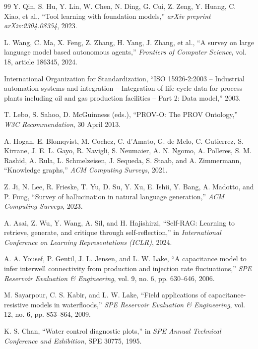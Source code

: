 \documentclass{article}
\begin{document}
\begin{thebibliography}{99}
 Y. Qin, S. Hu, Y. Lin, W. Chen, N. Ding, G. Cui, Z. Zeng, Y. Huang, C. Xiao, et al., ``Tool learning with foundation models,'' \emph{arXiv preprint arXiv:2304.08354}, 2023.

 L. Wang, C. Ma, X. Feng, Z. Zhang, H. Yang, J. Zhang, et al., ``A survey on large language model based autonomous agents,'' \emph{Frontiers of Computer Science}, vol. 18, article 186345, 2024.

 International Organization for Standardization, ``ISO 15926-2:2003 -- Industrial automation systems and integration -- Integration of life-cycle data for process plants including oil and gas production facilities -- Part 2: Data model,'' 2003.

 T. Lebo, S. Sahoo, D. McGuinness (eds.), ``PROV-O: The PROV Ontology,'' \emph{W3C Recommendation}, 30 April 2013.

 A. Hogan, E. Blomqvist, M. Cochez, C. d'Amato, G. de Melo, C. Gutierrez, S. Kirrane, J. E. L. Gayo, R. Navigli, S. Neumaier, A. N. Ngomo, A. Polleres, S. M. Rashid, A. Rula, L. Schmelzeisen, J. Sequeda, S. Staab, and A. Zimmermann, ``Knowledge graphs,'' \emph{ACM Computing Surveys}, 2021.

 Z. Ji, N. Lee, R. Frieske, T. Yu, D. Su, Y. Xu, E. Ishii, Y. Bang, A. Madotto, and P. Fung, ``Survey of hallucination in natural language generation,'' \emph{ACM Computing Surveys}, 2023.

 A. Asai, Z. Wu, Y. Wang, A. Sil, and H. Hajishirzi, ``Self-RAG: Learning to retrieve, generate, and critique through self-reflection,'' in \emph{International Conference on Learning Representations (ICLR)}, 2024.

 A. A. Yousef, P. Gentil, J. L. Jensen, and L. W. Lake, ``A capacitance model to infer interwell connectivity from production and injection rate fluctuations,'' \emph{SPE Reservoir Evaluation \& Engineering}, vol. 9, no. 6, pp. 630--646, 2006.

 M. Sayarpour, C. S. Kabir, and L. W. Lake, ``Field applications of capacitance-resistive models in waterfloods,'' \emph{SPE Reservoir Evaluation \& Engineering}, vol. 12, no. 6, pp. 853--864, 2009.

 K. S. Chan, ``Water control diagnostic plots,'' in \emph{SPE Annual Technical Conference and Exhibition}, SPE 30775, 1995.


\end{thebibliography}
\end{document}

